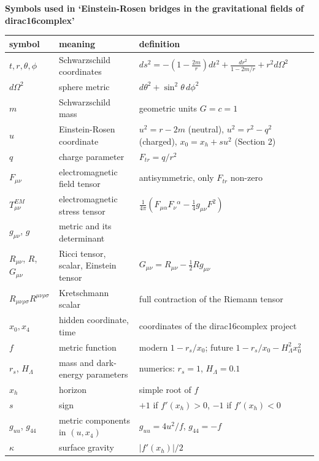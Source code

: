 \documentclass[10pt]{article}
\begin{document}
{\raggedright\LARGE\bfseries Symbols used in `Einstein-Rosen bridges in the gravitational fields of dirac16complex'\par}\medskip

{\small\begin{longtable}{>{\raggedright\arraybackslash}p{}>{\raggedright\arraybackslash}p{}>{\raggedright\arraybackslash}p{}}\toprule
symbol & meaning & definition \\\midrule\endhead
\bottomrule\endfoot
$t,r,\theta,\phi$ & Schwarzschild coordinates & $ds^2 = -(1-\frac{2m}r)dt^2+\frac{dr^2}{1-2m/r}+r^2d\Omega^2$ \\
$d\Omega^2$ & sphere metric & $d\theta^2+\sin^2\theta\,d\phi^2$ \\
$m$ & Schwarzschild mass & geometric units $G=c=1$ \\
$u$ & Einstein-Rosen coordinate & $u^2=r-2m$ (neutral), $u^2=r^2-q^2$ (charged), $x_0=x_h+su^2$ (Section 2) \\
$q$ & charge parameter & $F_{tr}=q/r^2$ \\
$F_{\mu\nu}$ & electromagnetic field tensor & antisymmetric, only $F_{tr}$ non-zero \\
$T^{EM}_{\mu\nu}$ & electromagnetic stress tensor & $\frac1{4\pi}(F_{\mu\alpha}F_\nu{}^\alpha-\frac14g_{\mu\nu}F^2)$ \\
$g_{\mu\nu}$, $g$ & metric and its determinant &  \\
$R_{\mu\nu}$, $R$, $G_{\mu\nu}$ & Ricci tensor, scalar, Einstein tensor & $G_{\mu\nu}=R_{\mu\nu}-\frac12Rg_{\mu\nu}$ \\
$R_{\mu\nu\rho\sigma}R^{\mu\nu\rho\sigma}$ & Kretschmann scalar & full contraction of the Riemann tensor \\
$x_0, x_4$ & hidden coordinate, time & coordinates of the dirac16complex project \\
$f$ & metric function & modern $1-r_s/x_0$; future $1-r_s/x_0-H_\Lambda^2x_0^2$ \\
$r_s$, $H_\Lambda$ & mass and dark-energy parameters & numerics: $r_s=1$, $H_\Lambda=0.1$ \\
$x_h$ & horizon & simple root of $f$ \\
$s$ & sign & $+1$ if $f'(x_h)>0$, $-1$ if $f'(x_h)<0$ \\
$g_{uu}$, $g_{44}$ & metric components in $(u,x_4)$ & $g_{uu}=4u^2/f$, $g_{44}=-f$ \\
$\kappa$ & surface gravity & $\lvert f'(x_h)\rvert/2$ \\

\end{longtable}}
\end{document}
